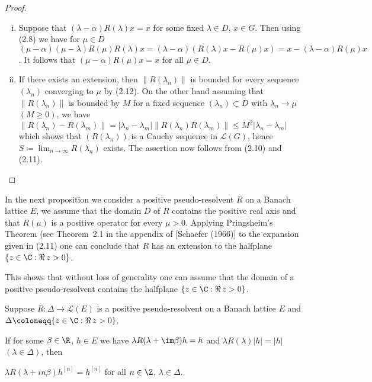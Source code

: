 \begin{proof}
	\begin{enumerate}[(i), wide]
		\item Suppose that $(\lambda-\alpha)R(\lambda)x = x$ for some fixed $\lambda \in D$, $x \in G$.
		Then using (2.8) we have for $\mu \in D$ $(\mu-\alpha)(\mu-\lambda)R(\mu)R(\lambda)x = (\lambda-\alpha)(R(\lambda)x - R(\mu)x) = x - (\lambda-\alpha)R(\mu)x$.
		It follows that $(\mu-\alpha)R(\mu)x = x$ for all $\mu \in D$.
		
		\item If there exists an extension, then $\|R(\lambda_{n})\|$ is bounded for every sequence $(\lambda_{n})$ converging to $\mu$ by (2.12).
		On the other hand assuming that $\|R(\lambda_{n})\|$ is bounded by $M$ for a fixed sequence $(\lambda_{n}) \subset D$ with $\lambda_{n} \to \mu$ $(M \geq 0)$, we have
		\newline
		 $\|R(\lambda_{n}) - R(\lambda_{m})\| = |\lambda_{n}-\lambda_{m}| \|R(\lambda_{n})R(\lambda_{m})\| \leq M^2|\lambda_{n}-\lambda_{m}|$ which shows that $(R(\lambda_{n}))$ is a Cauchy sequence in $\mathcal{L}(G)$, hence $S \coloneq \lim_{n\to\infty}R(\lambda_{n})$ exists.
		The assertion now follows from (2.10) and (2.11).
	\end{enumerate}
\end{proof}

In the next proposition we consider a positive pseudo-resolvent $R$ on a Banach lattice $E$, \ie  we assume that the domain $D$ of $R$ contains the positive real axis and that $R(\mu)$ is a positive operator for every $\mu > 0$.
Applying Pringsheim's Theorem (see Theorem~2.1 in the appendix
%
%
of [Schaefer (1966)] to the expansion given in (2.11) one can conclude that $R$ has an extension to the halfplane $\{z \in \C  : \Re\, z > 0\}$.

This shows that without loss of generality one can assume that the domain of a positive pseudo-resolvent contains the halfplane $\{z \in \C  : \Re\, z > 0\}$.
\begin{proposition}\label{prop:c3-2.7}
	Suppose $R : \Delta \to \mathcal{L}(E)$ is a positive pseudo-resolvent on a Banach lattice $E$ and $\Delta \coloneqq \{z \in \C  : \Re\, z > 0\}$.
	
	If for some $\beta \in \R $, $h \in E$ we have
	$\lambda R(\lambda+\im\beta)h = h$ and $\lambda R(\lambda)|h| = |h|$ $(\lambda \in \Delta)$, then
	
	$\lambda R(\lambda+in\beta)h^{[n]} = h^{[n]}$ for all $n \in \Z$, $\lambda \in \Delta$.
\end{proposition}

